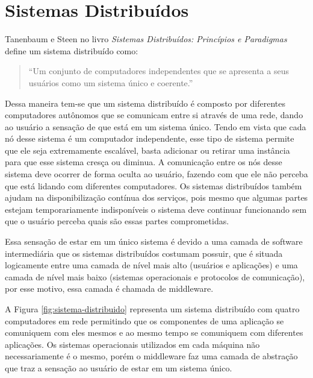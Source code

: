 \section{Sistemas Distribuídos}

    Tanenbaum e Steen no livro \textit{Sistemas Distribuídos: Princípios e Paradigmas} define um sistema distribuído como: %

    \begin{quote}
        ``Um conjunto de computadores independentes que se apresenta a seus usuários como um sistema único e coerente.''
     \end{quote}

    Dessa maneira tem-se que um sistema distribuído é composto por diferentes computadores autônomos que se comunicam entre si através de uma rede, dando ao usuário a sensação de que está em um sistema único. Tendo em vista que cada nó desse sistema é um computador independente, esse tipo de sistema permite que ele seja extremamente escalável, basta adicionar ou retirar uma instância para que esse sistema cresça ou diminua. A comunicação entre os nós desse sistema deve ocorrer de forma oculta ao usuário, fazendo com que ele não perceba que está lidando com diferentes computadores. Os sistemas distribuídos também ajudam na disponibilização contínua dos serviços, pois mesmo que algumas partes estejam temporariamente indisponíveis o sistema deve continuar funcionando sem que o usuário perceba quais são essas partes comprometidas.

    Essa sensação de estar em um único sistema é devido a uma camada de software intermediária que os sistemas distribuídos costumam possuir, que é situada logicamente entre uma camada de nível mais alto (usuários e aplicações) e uma camada de nível mais baixo (sistemas operacionais e protocolos de comunicação), por esse motivo, essa camada é chamada de middleware.

    A Figura \ref{fig:sistema-distribuido} representa um sistema distribuído com quatro computadores em rede permitindo que os componentes de uma aplicação se comuniquem com eles mesmos e ao mesmo tempo se comuniquem com diferentes aplicações. Os sistemas operacionais utilizados em cada máquina não necessariamente é o mesmo, porém o middleware faz uma camada de abstração que traz a sensação ao usuário de estar em um sistema único.
            



    